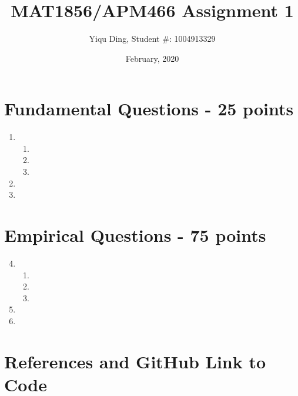 \documentclass{article}
\title{MAT1856/APM466 Assignment 1}
\author{Yiqu Ding, Student \#: 1004913329}
\date{February, 2020}
\begin{document}
\maketitle

\section*{Fundamental Questions - 25 points}

\begin{enumerate}
    \item \hfill
    \begin{enumerate}
        \item 
        \item
        \item
    \end{enumerate}
    \item 
    \item
\end{enumerate}



\section*{Empirical Questions - 75 points} 

\begin{enumerate}
\setcounter{enumi}{3} 
    \item \hfill
    \begin{enumerate}
        \item  
        \item 
        \item 
    \end{enumerate}
    \item 
    \item 
\end{enumerate}

\section*{References and GitHub Link to Code}
\end{document}
